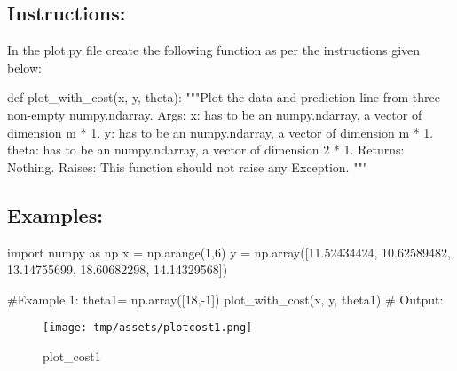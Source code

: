 \documentclass[]{article}
\newenvironment{Shaded}{\begin{snugshade}}{\end{snugshade}}
\newcommand{\CommentTok}[1]{\textcolor[rgb]{0.48,0.49,0.49}{#1}}
\newcommand{\DecValTok}[1]{\textcolor[rgb]{0.96,0.45,0.00}{#1}}
\newcommand{\FloatTok}[1]{\textcolor[rgb]{0.96,0.45,0.00}{#1}}
\newcommand{\ImportTok}[1]{\textcolor[rgb]{0.15,0.68,0.38}{#1}}
\newcommand{\KeywordTok}[1]{\textcolor[rgb]{0.81,0.81,0.76}{#1}}
\newcommand{\NormalTok}[1]{\textcolor[rgb]{0.81,0.81,0.76}{#1}}
\newcommand{\OperatorTok}[1]{\textcolor[rgb]{0.81,0.81,0.76}{#1}}
\begin{document}
\hypertarget{instructions-6}{%
\subsection{Instructions:}\label{instructions-6}}

In the plot.py file create the following function as per the
instructions given below:

\begin{Shaded}
\begin{Highlighting}[]
\KeywordTok{def}\NormalTok{ plot_with_cost(x, y, theta):}
    \CommentTok{"""Plot the data and prediction line from three non-empty numpy.ndarray.}
\CommentTok{    Args:}
\CommentTok{      x: has to be an numpy.ndarray, a vector of dimension m * 1.}
\CommentTok{      y: has to be an numpy.ndarray, a vector of dimension m * 1.}
\CommentTok{      theta: has to be an numpy.ndarray, a vector of dimension 2 * 1.}
\CommentTok{    Returns:}
\CommentTok{        Nothing.}
\CommentTok{    Raises:}
\CommentTok{      This function should not raise any Exception.}
\CommentTok{    """}
\end{Highlighting}
\end{Shaded}

\newpage

\hypertarget{examples-7}{%
\subsection{Examples:}\label{examples-7}}

\begin{Shaded}
\begin{Highlighting}[]
\ImportTok{import}\NormalTok{ numpy }\ImportTok{as}\NormalTok{ np}
\NormalTok{x }\OperatorTok{=}\NormalTok{ np.arange(}\DecValTok{1}\NormalTok{,}\DecValTok{6}\NormalTok{)}
\NormalTok{y }\OperatorTok{=}\NormalTok{ np.array([}\FloatTok{11.52434424}\NormalTok{, }\FloatTok{10.62589482}\NormalTok{, }\FloatTok{13.14755699}\NormalTok{, }\FloatTok{18.60682298}\NormalTok{, }\FloatTok{14.14329568}\NormalTok{])}

\CommentTok{#Example 1:}
\NormalTok{theta1}\OperatorTok{=}\NormalTok{ np.array([}\DecValTok{18}\NormalTok{,}\OperatorTok{-}\DecValTok{1}\NormalTok{])}
\NormalTok{plot_with_cost(x, y, theta1)}
\CommentTok{# Output:}
\end{Highlighting}
\end{Shaded}

\begin{figure}
\centering
\texttt{[image: tmp/assets/plotcost1.png]}
\caption{plot\_cost1}
\end{figure}
\end{document}
